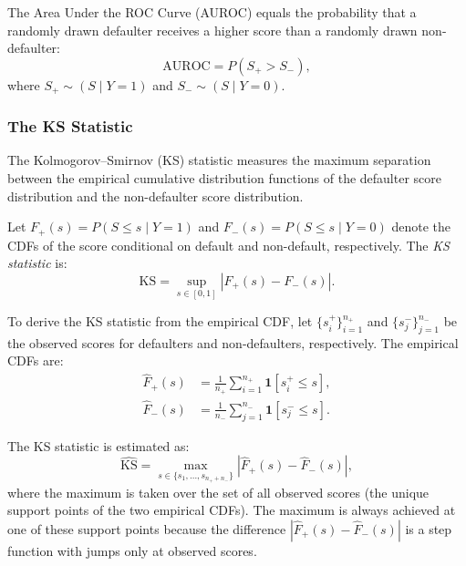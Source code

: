 \begin{context}
The Area Under the ROC Curve (AUROC) equals the probability that a randomly drawn defaulter receives a higher score than a randomly drawn non-defaulter:
\begin{equation}
  \text{AUROC} = P(S_+ > S_-),
  \label{eq:auroc}
\end{equation}
where $S_+ \sim (S \mid Y = 1)$ and $S_- \sim (S \mid Y = 0)$.

\subsubsection*{The KS Statistic}

The Kolmogorov--Smirnov (KS) statistic measures the maximum separation between the empirical cumulative distribution functions of the defaulter score distribution and the non-defaulter score distribution.

\begin{definition}[KS Statistic]
\label{def:ks}
Let $F_+(s) = P(S \leq s \mid Y = 1)$ and $F_-(s) = P(S \leq s \mid Y = 0)$ denote the CDFs of the score conditional on default and non-default, respectively. The \emph{KS statistic} is:
\begin{equation}
  \text{KS} = \sup_{s \in [0,1]} |F_+(s) - F_-(s)|.
  \label{eq:ks}
\end{equation}
\end{definition}

\begin{deepdive}
To derive the KS statistic from the empirical CDF, let $\{s_i^+\}_{i=1}^{n_+}$ and $\{s_j^-\}_{j=1}^{n_-}$ be the observed scores for defaulters and non-defaulters, respectively. The empirical CDFs are:
\begin{align}
  \hat{F}_+(s) &= \frac{1}{n_+} \sum_{i=1}^{n_+} \mathbf{1}[s_i^+ \leq s], \label{eq:ecdf-pos} \\
  \hat{F}_-(s) &= \frac{1}{n_-} \sum_{j=1}^{n_-} \mathbf{1}[s_j^- \leq s]. \label{eq:ecdf-neg}
\end{align}

The KS statistic is estimated as:
\begin{equation}
  \widehat{\text{KS}} = \max_{s \in \{s_1, \ldots, s_{n_+ + n_-}\}} |\hat{F}_+(s) - \hat{F}_-(s)|,
  \label{eq:ks-empirical}
\end{equation}
where the maximum is taken over the set of all observed scores (the unique support points of the two empirical CDFs). The maximum is always achieved at one of these support points because the difference $|\hat{F}_+(s) - \hat{F}_-(s)|$ is a step function with jumps only at observed scores.
\end{deepdive}


\end{context}
